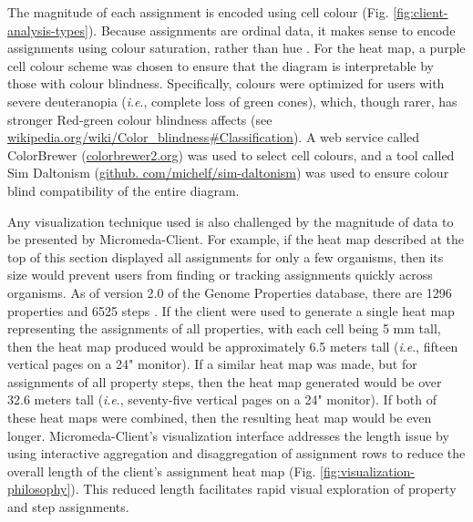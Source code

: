 The magnitude of each assignment is encoded using cell colour (Fig. 
\ref{fig:client-analysis-types}). Because assignments are ordinal data, it makes 
sense to encode assignments using colour saturation, rather than hue 
\cite{munzner2015visualization}. For the heat map, a purple cell colour scheme 
was chosen to ensure that the diagram is interpretable by those with colour 
blindness. Specifically, colours were optimized for users with severe 
deuteranopia (\textit{i}.\textit{e}., complete loss of green cones), which, though rarer, has 
stronger Red-green colour blindness affects (see 
\href{http://wikipedia.org/wiki/Color_blindness#Classification}{wikipedia.org/wiki/Color\_blindness\#Classification}). 
A web service called ColorBrewer 
(\href{http://colorbrewer2.org}{colorbrewer2.org}) was used to select cell 
colours, and a tool called Sim Daltonism 
(\href{http://github.com/michelf/sim-daltonism}{github. 
com/michelf/sim-daltonism}) was used to ensure colour blind compatibility of the 
entire diagram. 

Any visualization technique used is also challenged by the magnitude of data to 
be presented by Micromeda-Client. For example, if the heat map described at the 
top of this section displayed all assignments for only a few organisms, then its 
size would prevent users from finding or tracking assignments quickly across 
organisms. As of version 2.0 of the Genome Properties database, there are 1296 
properties and 6525 steps \cite{richardson2018genome}. If the client were used 
to generate a single heat map representing the assignments of all properties, 
with each cell being 5 mm tall, then the heat map produced would be 
approximately 6.5 meters tall (\textit{i}.\textit{e}., fifteen vertical pages on 
a 24" monitor). If a similar heat map was made, but for assignments of all 
property steps, then the heat map generated would be over 32.6 meters tall 
(\textit{i}.\textit{e}., seventy-five vertical pages on a 24" monitor). If both 
of these heat maps were combined, then the resulting heat map would be even 
longer. Micromeda-Client's visualization interface addresses the length issue by 
using interactive aggregation and disaggregation \cite{munzner2015visualization} 
of assignment rows to reduce the overall length of the client's assignment heat 
map (Fig. \ref{fig:visualization-philosophy}). This reduced length facilitates 
rapid visual exploration of property and step assignments.

